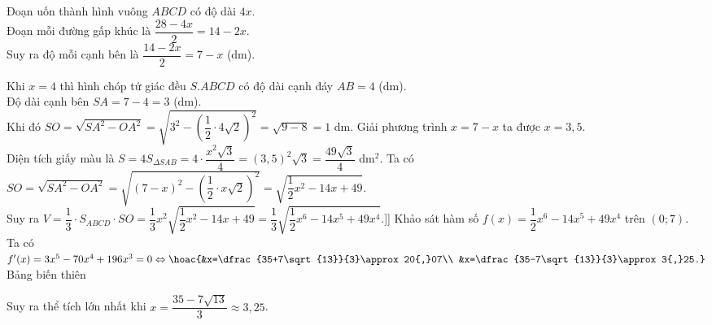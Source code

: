 \begin{ex}
{\begin{center}
		\end{center}
		\begin{itemchoice}
			\itemch 
			Đoạn uốn thành hình vuông $ABCD$ có độ dài $4x$.\\ Đoạn mỗi đường gấp khúc là $\dfrac{28-4x}{2}=14-2x$.\\ Suy ra độ mỗi cạnh bên là $\dfrac{14-2x}{2}=7-x$ (dm).
			
			\itemch
			Khi $x=4$ thì hình chóp tứ giác đều $S.ABCD$ có độ dài cạnh đáy $AB=4$ (dm).\\ 
			Độ dài cạnh bên $SA=7-4=3$ (dm).\\ 
			Khi đó $SO=\sqrt{SA^2-OA^2}=\sqrt{3^2-\left(\dfrac{1}{2}\cdot 4\sqrt{2}\right)^2}=\sqrt{9-8}=1$ dm.
			\itemch
			Giải phương trình $x=7-x$ ta được $x=3{,}5$.\\
			Diện tích giấy màu là $S=4S_{\Delta SAB}=4\cdot \dfrac{x^2\sqrt{3}}{4}=(3{,}5)^2\sqrt{3}=\dfrac{49\sqrt{3}}{4}$ dm$^2$.
			\itemch Ta có 
		$SO=\sqrt{SA^2-OA^2}=\sqrt{(7-x)^2-\left(\dfrac{1}{2}\cdot x\sqrt{2}\right)^2}=\sqrt{\dfrac{1}{2}x^2-14x+49}$.\\
		Suy ra $V=\dfrac{1}{3}\cdot S_{ABCD}\cdot SO = \dfrac{1}{3}x^2\sqrt{\dfrac{1}{2}x^2-14x+49}=\dfrac{1}{3}\sqrt{\dfrac{1}{2}x^6-14x^5+49x^4}$.]]
	Khảo sát hàm số $f(x)=\dfrac{1}{2}x^6-14x^5+49x^4$ trên $(0;7)$.\\
		Ta có $f'(x)=3x^5-70x^4+196x^3=0 \Leftrightarrow \hoac{&x=\dfrac{35+7\sqrt{13}}{3}\approx 20{,}07\\ &x=\dfrac{35-7\sqrt{13}}{3}\approx 3{,}25.}$\\
	Bảng biến thiên
			\begin{center}
			\end{center}
			Suy ra thể tích lớn nhất khi $x=\dfrac{35-7\sqrt{13}}{3} \approx 3{,}25$.
		\end{itemchoice}
	}
\end{ex}

